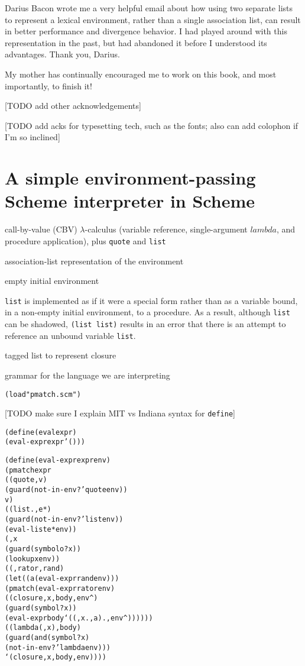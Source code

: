 \documentclass{book}
\begin{document}
Darius Bacon wrote me a very helpful email about how using two separate lists to represent a lexical environment, rather than a single association list, can result in better performance and divergence behavior.  I had played around with this representation in the past, but had abandoned it before I understood its advantages.  Thank you, Darius.

My mother has continually encouraged me to work on this book, and most importantly, to finish it!

[TODO add other acknowledgements]

[TODO add acks for typesetting tech, such as the fonts; also can add colophon if I'm so inclined]

\mainmatter

\chapter{A simple environment-passing Scheme interpreter in Scheme}%

call-by-value (CBV) $\lambda$-calculus (variable reference, single-argument $lambda$, and procedure application), plus \verb|quote| and \verb|list|

association-list representation of the environment

empty initial environment

\verb|list| is implemented as if it were a special form rather than as a variable bound, in a non-empty initial environment, to a procedure.  As a result, although \verb|list| can be shadowed, \verb|(list list)| results in an error that there is an attempt to reference an unbound variable \verb|list|.

tagged list to represent closure

grammar for the language we are interpreting

\begin{alltt}
(load "pmatch.scm")
\end{alltt}

[TODO make sure I explain MIT vs Indiana syntax for \verb|define|]

\begin{alltt}
(define (eval expr)
  (eval-expr expr '()))
\end{alltt}

\begin{alltt}
(define (eval-expr expr env)
  (pmatch expr
    ((quote ,v)
     (guard (not-in-env? 'quote env))
     v)
    ((list . ,e*)
     (guard (not-in-env? 'list env))
     (eval-list e* env))
    (,x
     (guard (symbolo? x))
     (lookup x env))
    ((,rator ,rand)
     (let ((a (eval-expr rand env)))
       (pmatch (eval-expr rator env)
         ((closure ,x ,body ,env^)
          (guard (symbol? x))
          (eval-expr body `((,x . ,a) . ,env^))))))
    ((lambda (,x) ,body)
     (guard (and (symbol? x)
                 (not-in-env? 'lambda env)))
     `(closure ,x ,body ,env))))
\end{alltt}
\end{document}
